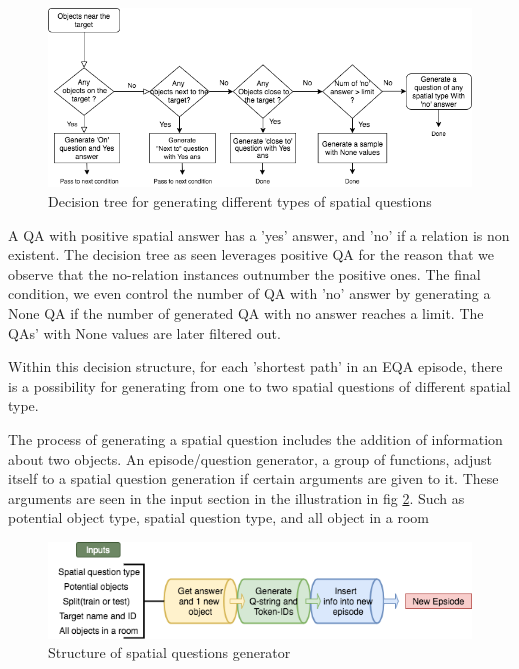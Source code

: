 \begin{figure}[h]
\includegraphics[scale=0.4]{images/spatialconditions.png} %
\caption{Decision tree for generating different types of spatial questions}
\label{fig:spatial}
\end{figure}

A QA with positive spatial answer has a 'yes' answer, and 'no' if a relation is non existent. The decision tree as seen \label{fig:spatial} leverages positive QA for the reason that we observe that the no-relation instances outnumber the positive ones. The final condition, we even control the number of QA with 'no' answer by generating a None QA if the number of generated QA with no answer reaches a limit. The QAs' with None values are later filtered out.

Within this decision structure, for each 'shortest path' in an EQA episode, there is a possibility for generating from one to two spatial questions of different spatial type. 

The process of generating a spatial question includes the addition of information about two objects. An episode/question generator, a group of functions, adjust itself to a spatial question generation if certain arguments are given to it. These arguments are seen in the input section  in the illustration in fig \ref{fig:spatialGen}. Such as potential  object type, spatial question type, and all object in a room 

\begin{figure}[h]
\includegraphics[scale=0.4]{images/spatialGenerator.png} %
\caption{Structure of spatial questions generator}
\label{fig:spatialGen}
\end{figure}

